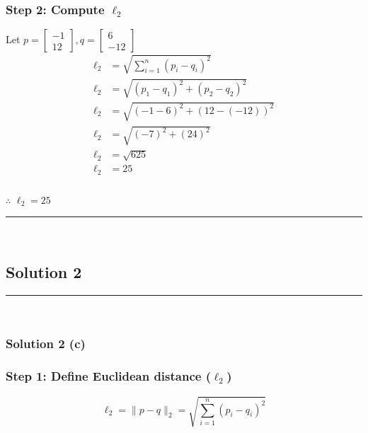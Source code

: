 \documentclass{article}
\begin{document}
\subsubsection*{Step 2: Compute $\ell_2$}
\parbox{\textwidth}{
Let $p = \begin{bmatrix} -1 \\ 12 \end{bmatrix}, q = \begin{bmatrix} 6 \\ -12 \end{bmatrix}$
$$
\begin{aligned}
\ell_2 &= \sqrt{\sum_{i=1}^{n} (p_i - q_i)^2}\\
\ell_2 &= \sqrt{(p_1 - q_1)^{2}+(p_2 - q_2)^{2}}\\
\ell_2 &= \sqrt{(-1 - 6)^{2}+(12 - (-12))^{2}}\\
\ell_2 &= \sqrt{(-7)^{2}+(24)^{2}}\\
\ell_2 &= \sqrt{625}\\
\ell_2 &= 25
\end{aligned}
$$
}
\subsubsection*{\normalfont}{$\therefore$ $\ell_{2} = 25$}

\noindent\rule{\textwidth}{0.4pt}\\


\subsection*{Solution 2}
\noindent\rule{\textwidth}{0.4pt}\\
\subsubsection*{Solution 2 (c)}
\subsubsection*{Step 1: Define Euclidean distance ($\ell_2$)}
\parbox{\textwidth}{

$$\ell_2 = \|p - q\|_2 = \sqrt{\sum_{i=1}^{n} (p_i - q_i)^2}$$

}
\end{document}
